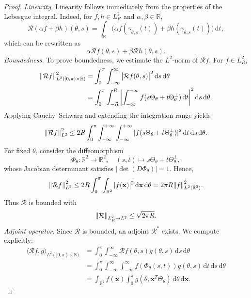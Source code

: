 \documentclass[12pt,a4paper]{article}
\begin{document}
\begin{proof}
\emph{Linearity.}  
Linearity follows immediately from the properties of the Lebesgue integral. Indeed, for $f,h \in L^2_R$ and $\alpha, \beta \in \mathbb{R}$,  
\[
\mathcal{R}(\alpha f + \beta h)(\theta,s) 
= \int_\mathbb{R} \big( \alpha f(\gamma_{\theta,s}(t)) + \beta h(\gamma_{\theta,s}(t)) \big)\,\mathrm{d}t,
\]  
which can be rewritten as  
\[
\alpha \mathcal{R}f(\theta,s) + \beta \mathcal{R}h(\theta,s).
\]
\newline\newline
\emph{Boundedness.}  
To prove boundedness, we estimate the $L^2$-norm of $\mathcal{R} f$. For $f \in L^2_R$,  
\begin{align*}
\norm{\mathcal{R} f}_{L^2([0,\pi)\times \mathbb{R})}^2
&= \int_0^\pi \int_{-\infty}^\infty \big| \mathcal{R}f(\theta,s)\big|^2 \,\mathrm{d}s\,\mathrm{d}\theta \\
&= \int_0^\pi \int_{-R}^R \left| \int_{-\infty}^{+\infty} f(s\Theta_\theta + t \Theta_\theta^\perp)\,\mathrm{d}t \right|^2 \mathrm{d}s\,\mathrm{d}\theta .
\end{align*}
Applying Cauchy--Schwarz and extending the integration range yields
\[
\norm{\mathcal{R} f}_{L^2}^2
\leq 2R \int_0^\pi \int_{-\infty}^{+\infty} \int_{-\infty}^{+\infty} |f(s\Theta_\theta + t \Theta_\theta^\perp)|^2 \,\mathrm{d}t \,\mathrm{d}s \,\mathrm{d}\theta .
\]
For fixed $\theta$, consider the diffeomorphism
\[
\Phi_\theta : \mathbb{R}^2 \to \mathbb{R}^2, \quad (s,t) \mapsto s \Theta_\theta + t \Theta_\theta^\perp,
\]
whose Jacobian determinant satisfies $|\det(D\Phi_\theta)| = 1$. Hence,
\[
\norm{\mathcal{R} f}_{L^2}^2 \leq 2R \int_0^\pi \int_{\mathbb{R}^2} |f(\mathbf{x})|^2 \,\mathrm{d}\mathbf{x}\,\mathrm{d}\theta 
= 2\pi R \norm{f}_{L^2(\mathbb{R}^2)}^2 .
\]
Thus $\mathcal{R}$ is bounded with  
\[
\norm{\mathcal{R}}_{L^2_R \to L^2} \leq \sqrt{2\pi R}.
\]
\newline\newline
\emph{Adjoint operator.}  
Since $\mathcal{R}$ is bounded, an adjoint $\mathcal{R}^*$ exists. We compute explicitly:
\begin{align*}
\langle \mathcal{R} f, g \rangle_{L^2([0,\pi)\times \mathbb{R})}
&= \int_0^\pi \int_{-\infty}^\infty \mathcal{R}f(\theta,s) g(\theta,s)\,\mathrm{d}s\,\mathrm{d}\theta \\
&= \int_0^\pi \int_{-\infty}^\infty \int_{-\infty}^\infty f(\Phi_\theta(s,t)) g(\theta,s)\,\mathrm{d}t\,\mathrm{d}s\,\mathrm{d}\theta \\
&= \int_{\mathbb{R}^2} f(\mathbf{x}) \int_0^\pi g(\theta, \mathbf{x}^T \Theta_\theta)\,\mathrm{d}\theta \,\mathrm{d}\mathbf{x}.

\end{align*}
\end{proof}
\end{document}
